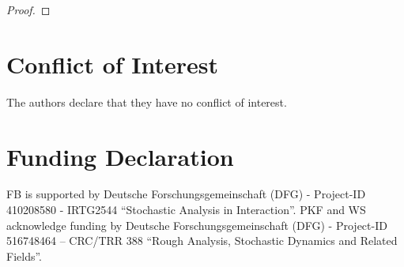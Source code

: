 \documentclass[10pt, a4paper]{article} %
\theoremstyle{definition}
\theoremstyle{plain}
\begin{document}
\begin{proof}

\end{proof}





\section*{Conflict of Interest}
The authors declare that they have no conflict of interest.

\section*{Funding Declaration} 
FB is supported by Deutsche Forschungsgemeinschaft (DFG) - Project-ID 410208580 - IRTG2544 ``Stochastic Analysis in Interaction''.
PKF and WS acknowledge funding by Deutsche Forschungsgemeinschaft (DFG) - Project-ID 516748464 – CRC/TRR 388 ``Rough Analysis, Stochastic Dynamics and Related Fields''.



\printbibliography
\end{document}
